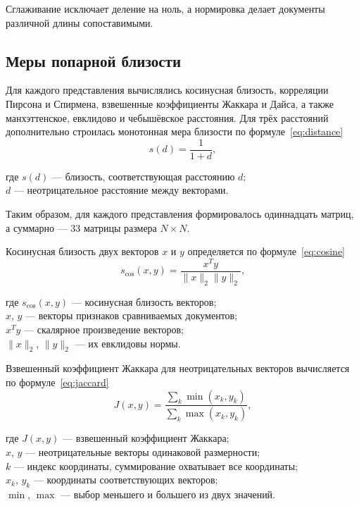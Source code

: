 \documentclass[a4paper,12pt]{extreport}
\begin{document}
Сглаживание исключает деление на ноль, а нормировка делает документы различной длины сопоставимыми.

\subsection{Меры попарной близости}

Для каждого представления вычислялись косинусная близость, корреляции Пирсона и Спирмена, взвешенные коэффициенты Жаккара и Дайса, а также манхэттенское, евклидово и чебышёвское расстояния. Для трёх расстояний дополнительно строилась монотонная мера близости по формуле~\eqref{eq:distance}
\begin{equation}
\label{eq:distance}
s(d)=\frac{1}{1+d},
\end{equation}

где $s(d)$ --- близость, соответствующая расстоянию $d$;\\
\phantom{где }$d$ --- неотрицательное расстояние между векторами.

Таким образом, для каждого представления формировалось одиннадцать матриц, а суммарно --- 33 матрицы размера $N\times N$.

Косинусная близость двух векторов $x$ и $y$ определяется по формуле~\eqref{eq:cosine}
\begin{equation}
\label{eq:cosine}
s_{\cos}(x,y)=\frac{x^{T}y}{\|x\|_2\|y\|_2},
\end{equation}

где $s_{\cos}(x,y)$ --- косинусная близость векторов;\\
\phantom{где }$x$, $y$ --- векторы признаков сравниваемых документов;\\
\phantom{где }$x^{T}y$ --- скалярное произведение векторов;\\
\phantom{где }$\|x\|_2$, $\|y\|_2$ --- их евклидовы нормы.

Взвешенный коэффициент Жаккара для неотрицательных векторов вычисляется по формуле~\eqref{eq:jaccard}
\begin{equation}
J(x,y)=\frac{\sum_k\min(x_k,y_k)}{\sum_k\max(x_k,y_k)}, \label{eq:jaccard}
\end{equation}

где $J(x,y)$ --- взвешенный коэффициент Жаккара;\\
\phantom{где }$x$, $y$ --- неотрицательные векторы одинаковой размерности;\\
\phantom{где }$k$ --- индекс координаты, суммирование охватывает все координаты;\\
\phantom{где }$x_k$, $y_k$ --- координаты соответствующих векторов;\\
\phantom{где }$\min$, $\max$ --- выбор меньшего и большего из двух значений.
\end{document}
